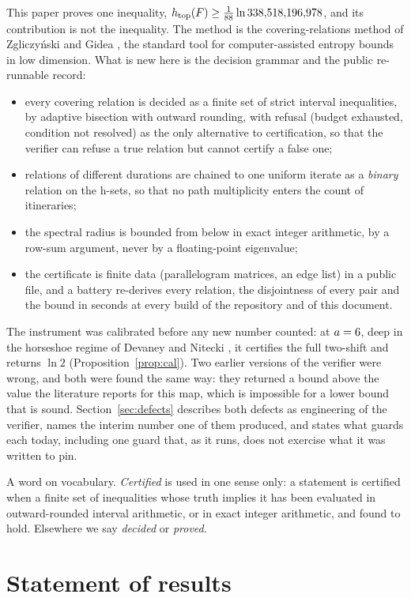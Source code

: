 \documentclass[11pt]{article}
\newcommand{\htop}{h_{\mathrm{top}}}
\begin{document}
This paper proves one inequality, $\htop(F)\ge\ExactBound$, and its contribution is not the inequality. The method
is the covering-relations method of Zgliczy\'nski and Gidea \cite{ZG04}, the standard tool for computer-assisted
entropy bounds in low dimension. What is new here is the decision grammar and the public re-runnable record:
\begin{itemize}
\item every covering relation is decided as a finite set of strict interval inequalities, by adaptive bisection with
outward rounding, with refusal (budget exhausted, condition not resolved) as the only alternative to certification,
so that the verifier can refuse a true relation but cannot certify a false one;
\item relations of different durations are chained to one uniform iterate as a \emph{binary} relation on the
h-sets, so that no path multiplicity enters the count of itineraries;
\item the spectral radius is bounded from below in exact integer arithmetic, by a row-sum argument, never by a
floating-point eigenvalue;
\item the certificate is finite data (parallelogram matrices, an edge list) in a public file, and a battery
re-derives every relation, the disjointness of every pair and the bound in \BatterySeconds{} seconds at every build
of the repository and of this document.
\end{itemize}
The instrument was calibrated before any new number counted: at $a=6$, deep in the horseshoe regime of Devaney
and Nitecki \cite{DN79}, it certifies the full two-shift and returns $\ln 2$ (Proposition~\ref{prop:cal}). Two
earlier versions of the verifier were wrong, and both were found the same way: they returned a bound above the
value the literature reports for this map, which is impossible for a lower bound that is sound. Section~\ref{sec:defects}
describes both defects as engineering of the verifier, names the interim number one of them produced, and states
what guards each today, including one guard that, as it runs, does not exercise what it was written to pin.

A word on vocabulary. \emph{Certified} is used in one sense only: a statement is certified when a finite set of
inequalities whose truth implies it has been evaluated in outward-rounded interval arithmetic, or in exact integer
arithmetic, and found to hold. Elsewhere we say \emph{decided} or \emph{proved}.

\section{Statement of results}
\end{document}
